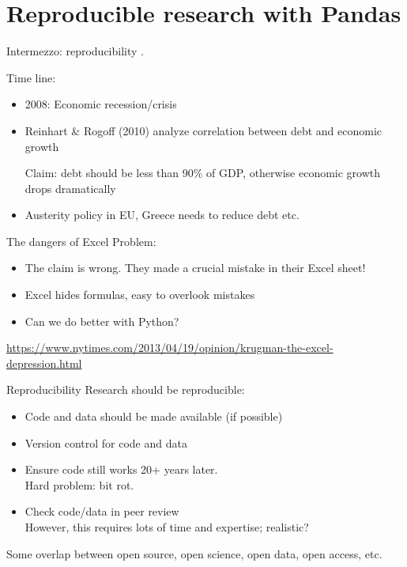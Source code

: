 \documentclass{beamer}
\begin{document}
\section{Reproducible research with Pandas}
\frame{\tableofcontents[currentsection]}

\begin{frame}{Intermezzo: reproducibility}
    .

    Time line:
    \begin{itemize}
        \item 2008: Economic recession/crisis
        \item Reinhart \& Rogoff (2010) analyze correlation between debt and
            economic growth \\
            \begin{block}{Claim:}
            debt should be less than 90\% of GDP, otherwise economic growth
                drops dramatically
            \end{block}
        \item Austerity policy in EU, Greece needs to reduce debt etc.
    \end{itemize}
\end{frame}

\begin{frame}{The dangers of Excel}
    Problem:
    \begin{itemize}
        \item The claim is wrong.
            They made a crucial mistake in their Excel sheet!
        \item Excel hides formulas, easy to overlook mistakes
        \item Can we do better with Python?
    \end{itemize}

    \vspace{1em}
    \url{https://www.nytimes.com/2013/04/19/opinion/krugman-the-excel-depression.html}
\end{frame}

\begin{frame}{Reproducibility}
    Research should be reproducible:

    \begin{itemize}
        \item Code and data should be made available (if possible)
        \item Version control for code and data
        \item Ensure code still works 20+ years later. \\
                Hard problem: bit rot.
        \item Check code/data in peer review \\
            However, this requires lots of time and expertise; realistic?
    \end{itemize}

    Some overlap between open source, open science, open data, open access, etc.
\end{frame}
\end{document}
